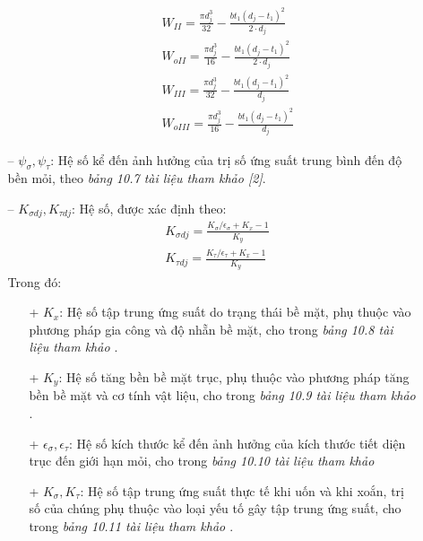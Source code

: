 \begin{itemize}
\begin{itemize}
\begin{itemize}
                    \begin{align*}
                        &W_{II} = \frac{\pi d_j^3}{32} - \frac{bt_1(d_j - t_1)^2}{2 \cdot d_j}\\
                        &W_{oII} = \frac{\pi d_j^3}{16} - \frac{bt_1(d_j - t_1)^2}{2 \cdot d_j}\\
                        &W_{III} = \frac{\pi d_j^3}{32} - \frac{bt_1(d_j - t_1)^2}{d_j}\\
                        &W_{oIII} = \frac{\pi d_j^3}{16} - \frac{bt_1(d_j - t_1)^2}{d_j}
                    \end{align*}
                \end{itemize}
                \item[--] $\psi_\sigma, \psi_\tau$: Hệ số kể đến ảnh hưởng của trị số ứng suất trung bình đến độ bền mỏi, theo \textit{bảng 10.7 tài liệu tham khảo [2]}. 
                \item[--] $K_{\sigma dj}, K_{\tau dj}$: Hệ số, được xác định theo:
                \begin{align*}
                    &K_{\sigma dj} = \frac{K_\sigma/\epsilon_\sigma + K_x - 1}{K_y}\\
                    &K_{\tau dj} = \frac{K_\tau/\epsilon_\tau + K_x - 1}{K_y}
                \end{align*}
                Trong đó:
                \begin{itemize}
                    \item[+] $K_x$: Hệ số tập trung ứng suất do trạng thái bề mặt, phụ thuộc vào phương pháp gia công và độ nhẵn bề mặt, cho trong \textit{bảng 10.8 tài liệu tham khảo \cite{tltk1}}.
                    \item[+] $K_y$: Hệ số tăng bền bề mặt trục, phụ thuộc vào phương pháp tăng bền bề mặt và cơ tính vật liệu, cho trong\textit{ bảng 10.9 tài liệu tham khảo \cite{tltk1}}.
                    \item[+] $\epsilon_\sigma, \epsilon_\tau$: Hệ số kích thước kể đến ảnh hưởng của kích thước tiết diện trục đến giới hạn mỏi, cho trong \textit{bảng 10.10 tài liệu tham khảo \cite{tltk1}}
                    \item[+] $K_\sigma, K_\tau$: Hệ số tập trung ứng suất thực tế khi uốn và khi xoắn, trị số của chúng phụ thuộc vào loại yếu tố gây tập trung ứng suất, cho trong \textit{bảng 10.11 tài liệu tham khảo \cite{tltk1}}.
                \end{itemize}
            \end{itemize}
    \end{itemize}
